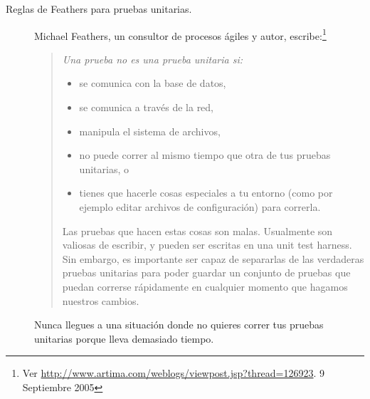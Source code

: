 \documentclass[a4paper,10pt,twoside]{book}
\begin{document}
\begin{description}


\item[Reglas de Feathers para pruebas unitarias.]
  Michael Feathers, un consultor de procesos \'agiles y autor, escribe:\footnote{Ver \url{http://www.artima.com/weblogs/viewpost.jsp?thread=126923}. 9 Septiembre 2005} 
  \begin{quotation}
  \noindent
  {\it
	Una prueba no es una prueba unitaria si:  
  \begin{itemize}
	\item se comunica con la base de datos,
	\item se comunica a trav\'es de la red,
	\item manipula el sistema de archivos,
	\item no puede correr al mismo tiempo que otra de tus pruebas unitarias, o
	\item tienes que hacerle cosas especiales a tu entorno (como por ejemplo editar archivos de configuraci\'on) para correrla.
 \end{itemize}

Las pruebas que hacen estas cosas son malas. Usualmente son valiosas de escribir, y pueden ser escritas
en una unit test harness.
Sin embargo, es importante ser capaz de separarlas de las verdaderas pruebas unitarias para poder
guardar un conjunto de pruebas que puedan correrse r\'apidamente en cualquier momento que hagamos nuestros
cambios.
 }
  \end{quotation}

Nunca llegues a una situaci\'on donde no quieres correr tus pruebas unitarias porque lleva demasiado tiempo.


\end{description}
\end{document}
